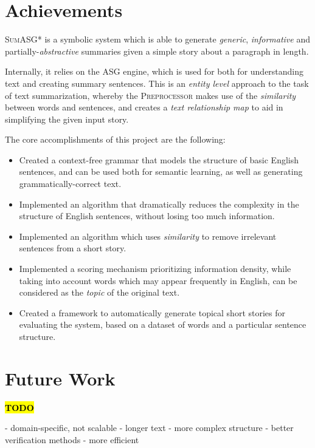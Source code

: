 \section{Achievements}

\textsc{SumASG*} is a symbolic system which is able to generate \textit{generic}, \textit{informative} and partially-\textit{abstractive} summaries given a simple story about a paragraph in length.

Internally, it relies on the ASG engine, which is used for both for understanding text and creating summary sentences. This is an \textit{entity level} approach to the task of text summarization, whereby the \textsc{Preprocessor} makes use of the \textit{similarity} between words and sentences, and creates a \textit{text relationship map} to aid in simplifying the given input story.

The core accomplishments of this project are the following:

\begin{itemize}
\item Created a context-free grammar that models the structure of basic English sentences, and can be used both for semantic learning, as well as generating grammatically-correct text.
\item Implemented an algorithm that dramatically reduces the complexity in the structure of English sentences, without losing too much information.
\item Implemented an algorithm which uses \textit{similarity} to remove irrelevant sentences from a short story.
\item Implemented a scoring mechanism prioritizing information density, while taking into account words which may appear frequently in English, can be considered as the \textit{topic} of the original text.
\item Created a framework to automatically generate topical short stories for evaluating the system, based on a dataset of words and a particular sentence structure.
\end{itemize}

\section{Future Work}

\textcolor{red}{\textbf{\hl{TODO}}}

- domain-specific, not scalable
- longer text
- more complex structure
- better verification methods
- more efficient